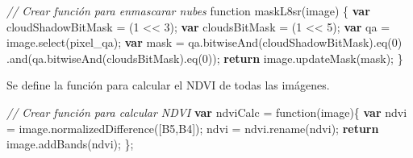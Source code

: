 \documentclass[
  12pt,
  letterpaper,
  twoside]{book}
\newenvironment{Shaded}{\begin{snugshade}}{\end{snugshade}}
\newcommand{\CommentTok}[1]{\textcolor[rgb]{0.24,0.58,0.00}{\textit{#1}}}
\newcommand{\ControlFlowTok}[1]{\textcolor[rgb]{0.00,0.00,0.00}{\textbf{#1}}}
\newcommand{\DecValTok}[1]{\textcolor[rgb]{0.28,0.53,0.93}{#1}}
\newcommand{\FunctionTok}[1]{\textcolor[rgb]{0.48,0.12,0.64}{#1}}
\newcommand{\KeywordTok}[1]{\textcolor[rgb]{0.48,0.12,0.64}{#1}}
\newcommand{\NormalTok}[1]{#1}
\newcommand{\OperatorTok}[1]{\textcolor[rgb]{0.00,0.00,0.00}{#1}}
\newcommand{\StringTok}[1]{\textcolor[rgb]{0.87,0.29,0.22}{#1}}
\begin{document}
\begin{Shaded}
\begin{Highlighting}[]
\CommentTok{// Crear función para enmascarar nubes}
\KeywordTok{function} \FunctionTok{maskL8sr}\NormalTok{(image) \{}
  \ControlFlowTok{var}\NormalTok{ cloudShadowBitMask }\OperatorTok{=}\NormalTok{ (}\DecValTok{1} \OperatorTok{\textless{}\textless{}} \DecValTok{3}\NormalTok{)}\OperatorTok{;}
  \ControlFlowTok{var}\NormalTok{ cloudsBitMask }\OperatorTok{=}\NormalTok{ (}\DecValTok{1} \OperatorTok{\textless{}\textless{}} \DecValTok{5}\NormalTok{)}\OperatorTok{;}
  \ControlFlowTok{var}\NormalTok{ qa }\OperatorTok{=}\NormalTok{ image}\OperatorTok{.}\FunctionTok{select}\NormalTok{(}\StringTok{\textquotesingle{}pixel\_qa\textquotesingle{}}\NormalTok{)}\OperatorTok{;}
  \ControlFlowTok{var}\NormalTok{ mask }\OperatorTok{=}\NormalTok{ qa}\OperatorTok{.}\FunctionTok{bitwiseAnd}\NormalTok{(cloudShadowBitMask)}\OperatorTok{.}\FunctionTok{eq}\NormalTok{(}\DecValTok{0}\NormalTok{)}
                 \OperatorTok{.}\FunctionTok{and}\NormalTok{(qa}\OperatorTok{.}\FunctionTok{bitwiseAnd}\NormalTok{(cloudsBitMask)}\OperatorTok{.}\FunctionTok{eq}\NormalTok{(}\DecValTok{0}\NormalTok{))}\OperatorTok{;}
  \ControlFlowTok{return}\NormalTok{ image}\OperatorTok{.}\FunctionTok{updateMask}\NormalTok{(mask)}\OperatorTok{;}
\NormalTok{\}}
\end{Highlighting}
\end{Shaded}

Se define la función para calcular el NDVI de todas las imágenes.

\begin{Shaded}
\begin{Highlighting}[]
\CommentTok{// Crear función para calcular NDVI}
\ControlFlowTok{var}\NormalTok{ ndviCalc }\OperatorTok{=} \KeywordTok{function}\NormalTok{(image)\{}
  \ControlFlowTok{var}\NormalTok{ ndvi }\OperatorTok{=}\NormalTok{ image}\OperatorTok{.}\FunctionTok{normalizedDifference}\NormalTok{([}\StringTok{\textquotesingle{}B5\textquotesingle{}}\OperatorTok{,}\StringTok{\textquotesingle{}B4\textquotesingle{}}\NormalTok{])}\OperatorTok{;}
\NormalTok{  ndvi }\OperatorTok{=}\NormalTok{ ndvi}\OperatorTok{.}\FunctionTok{rename}\NormalTok{(}\StringTok{\textquotesingle{}ndvi\textquotesingle{}}\NormalTok{)}\OperatorTok{;}
    \ControlFlowTok{return}\NormalTok{ image}\OperatorTok{.}\FunctionTok{addBands}\NormalTok{(ndvi)}\OperatorTok{;}
\NormalTok{\}}\OperatorTok{;}
\end{Highlighting}
\end{Shaded}
\end{document}
